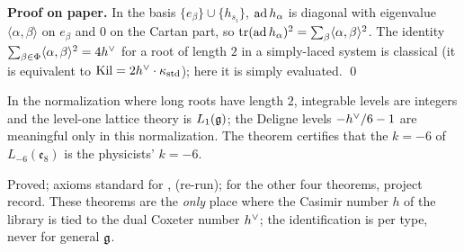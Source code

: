 \textbf{Proof on paper.} In the basis $\{e_\beta\}\cup\{h_{s_i}\}$, $\operatorname{ad} h_\alpha$ is diagonal with eigenvalue $\langle\alpha,\beta\rangle$ on
$e_\beta$ and $0$ on the Cartan part, so $\operatorname{tr}(\operatorname{ad} h_\alpha)^2=\sum_\beta\langle\alpha,\beta\rangle^2$. The identity
$\sum_{\beta\in\Phi}\langle\alpha,\beta\rangle^2=4h^\vee$ for a root of length $2$ in a simply-laced system is classical (it is equivalent
to $\operatorname{Kil}=2h^\vee\cdot\kappa_{\mathrm{std}}$); here it is simply evaluated. \qed

\begin{physics}
In the normalization where long roots have length $2$, integrable levels are integers and the level-one lattice theory is
$L_1(\mathfrak g)$; the Deligne levels $-h^\vee/6-1$ are meaningful only in this normalization. The theorem certifies that the
$k=-6$ of $L_{-6}(\mathfrak e_8)$ is the physicists' $k=-6$.
\end{physics}

\begin{status}
Proved; axioms standard for ,  (re-run); for the other four  theorems, project record.
These theorems are the \emph{only} place where the Casimir number $h$ of the library is tied to the dual Coxeter number $h^\vee$; the
identification is per type, never for general $\mathfrak g$.
\end{status}

